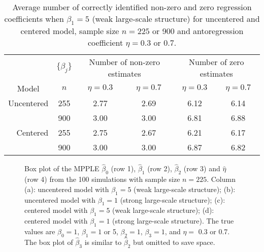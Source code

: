 \documentclass[authoryear,review, 11pt]{elsarticle}
\begin{document}
\newpage
%
%
\begin{table}[!htbp]
\caption{Average number of correctly identified non-zero and zero regression coefficients when $\beta_1=5$ (weak large-scale structure) for uncentered and centered model, sample size $n=225$ or 900 and antoregression coefficient $\eta=0.3$ or 0.7.} %
\centering  %
\begin{tabular}{rccccc} %
\hline\hline                        %
& $\{\beta_j\}$ & \multicolumn{2}{c}{Number of non-zero estimates}  & \multicolumn{2}{c}{Number of zero estimates}\\ [0.5ex]  %
\multicolumn{1}{c}{Model} & $n$ & $\eta=0.3$ & $\eta=0.7$ & $\eta=0.3$ & $\eta=0.7$ \\
\hline                  %

Uncentered &  255  & 2.77 & 2.69 &  6.12 & 6.14 \\
 &  900  & 3.00 & 3.00 & 6.81 & 6.88\\
Centered &  255  & 2.75 & 2.67& 6.21  & 6.17\\ 
  &  900 & 3.00 & 3.00 & 6.87 & 6.82\\ [1ex]      %
\hline %
\end{tabular}
\label{tab:selstrong} %
\end{table}

%
%
\begin{figure}[ht]
\begin{center}
\end{center}
\caption{Box plot of the MPPLE $\widehat{\beta}_0$ (row 1), $\widehat{\beta}_1$ (row 2), $\widehat{\beta}_2$ (row 3) and $\widehat{\eta}$ (row 4) from the 100 simulations with sample size $n=225$. Column (a): uncentered model with $\beta_1=5$ (weak large-scale structure); (b): uncentered model with $\beta_1=1$ (strong large-scale structure); (c): centered model with $\beta_1=5$ (weak large-scale structure); (d): centered model with $\beta_1=1$ (strong large-scale structure). The true values are $\beta_0=1$, $\beta_1=1$ or 5, $\beta_2=1$, $\beta_3=1$, and $\eta=$ 0.3 or 0.7. The box plot of $\widehat{\beta}_3$ is similar to $\widehat{\beta}_2$ but omitted to save space.}
\label{fig:mple225}
\end{figure}
\end{document}
